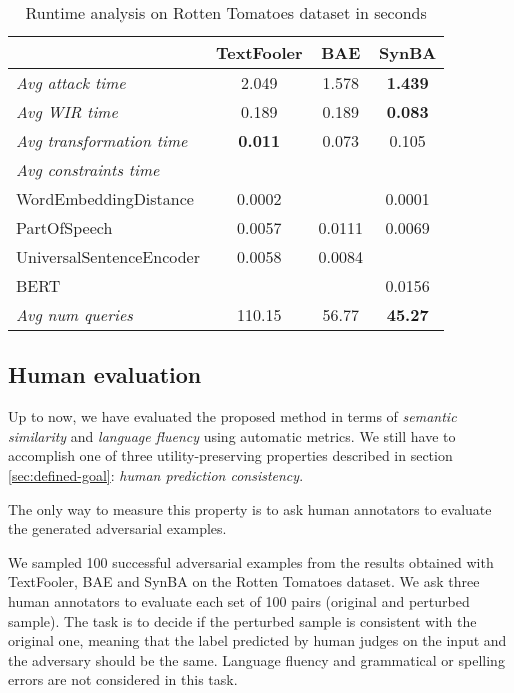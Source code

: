 \begin{table}[h]
    \footnotesize
    \centering
    \begin{tabular}{|l|c|c|c|}
        \hline
        {} &            \textbf{TextFooler} &   \textbf{BAE} &    \textbf{SynBA} \\
        \hline \hline
        \emph{Avg attack time}            &  2.049 &   1.578 &   \textbf{1.439} \\
        \hline
        \emph{Avg WIR time}               &  0.189 &   0.189 &  \textbf{0.083} \\
        \hline
        \emph{Avg transformation time}    &  \textbf{0.011} &   0.073 &   0.105 \\
        \hline
        \emph{Avg constraints time}       &         &          &          \\
        WordEmbeddingDistance        &  0.0002 &          &   0.0001 \\
        PartOfSpeech                 &  0.0057 &  0.0111  &   0.0069 \\
        UniversalSentenceEncoder     &  0.0058 &  0.0084  &          \\
        BERT                         &         &          &   0.0156 \\
        \hline
        \emph{Avg num queries}            &  110.15 &    56.77 &    \textbf{45.27} \\
        \hline
        \end{tabular}
    \caption{Runtime analysis on Rotten Tomatoes dataset in seconds}
    \label{tab:runtime-rotten}
\end{table}



\subsection{Human evaluation}\label{subsec:human-evaluation}

Up to now, we have evaluated the proposed method in terms of \emph{semantic similarity} and \emph{language fluency} using automatic metrics.
We still have to accomplish one of three utility-preserving properties described in section \ref{sec:defined-goal}: \emph{human prediction consistency}.

The only way to measure this property is to ask human annotators to evaluate the generated adversarial examples.

We sampled 100 successful adversarial examples from the results obtained with TextFooler, BAE and SynBA on the Rotten Tomatoes dataset.
We ask three human annotators to evaluate each set of 100 pairs (original and perturbed sample).
The task is to decide if the perturbed sample is consistent with the original one, meaning that the label predicted by human judges on the input and the adversary should be the same.
Language fluency and grammatical or spelling errors are not considered in this task.

